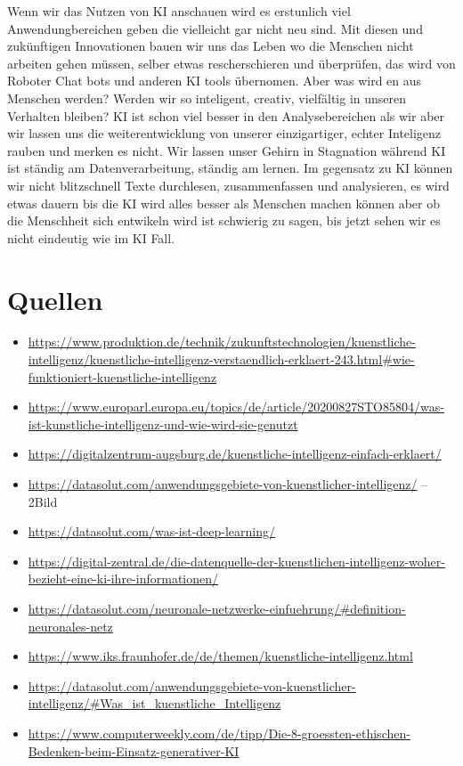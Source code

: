 \documentclass{report}
\begin{document}
 \textbf{}
 \textit{}
 Wenn wir das Nutzen von KI anschauen wird es erstunlich viel Anwendungbereichen geben die vielleicht gar nicht neu sind. Mit diesen
 und zukünftigen Innovationen bauen wir uns das Leben wo die Menschen nicht arbeiten gehen müssen, selber etwas rescherschieren und überprüfen,
 das wird von Roboter Chat bots und anderen KI tools übernomen. Aber was wird en aus Menschen werden? Werden wir so inteligent, creativ, 
 vielfältig in unseren Verhalten bleiben? KI ist schon viel besser in den Analysebereichen als wir aber wir lassen uns die weiterentwicklung
 von unserer einzigartiger, echter Inteligenz rauben und merken es nicht. Wir lassen unser Gehirn in Stagnation während KI ist ständig am Datenverarbeitung,
 ständig am lernen. Im gegensatz zu KI können wir nicht blitzschnell Texte durchlesen, zusammenfassen und analysieren, 
 es wird etwas dauern bis die KI wird alles besser als Menschen machen können aber ob die Menschheit sich entwikeln wird ist schwierig zu sagen,
 bis jetzt sehen wir es nicht eindeutig wie im KI Fall. 
\section{Quellen}


\begin{itemize}
\item \url{https://www.produktion.de/technik/zukunftstechnologien/kuenstliche-intelligenz/kuenstliche-intelligenz-verstaendlich-erklaert-243.html#wie-funktioniert-kuenstliche-intelligenz}
\item \url{https://www.europarl.europa.eu/topics/de/article/20200827STO85804/was-ist-kunstliche-intelligenz-und-wie-wird-sie-genutzt}
\item \url{https://digitalzentrum-augsburg.de/kuenstliche-intelligenz-einfach-erklaert/}
\item \url{https://datasolut.com/anwendungsgebiete-von-kuenstlicher-intelligenz/} -- 2Bild
\item \url{https://datasolut.com/was-ist-deep-learning/} 
\item \url{https://digital-zentral.de/die-datenquelle-der-kuenstlichen-intelligenz-woher-bezieht-eine-ki-ihre-informationen/}
\item \url{https://datasolut.com/neuronale-netzwerke-einfuehrung/#definition-neuronales-netz}
\item \url{https://www.iks.fraunhofer.de/de/themen/kuenstliche-intelligenz.html}
\item \url{https://datasolut.com/anwendungsgebiete-von-kuenstlicher-intelligenz/#Was_ist_kuenstliche_Intelligenz}
\item \url{https://www.computerweekly.com/de/tipp/Die-8-groessten-ethischen-Bedenken-beim-Einsatz-generativer-KI}
\end{itemize}

\printbibliography
\end{document}
